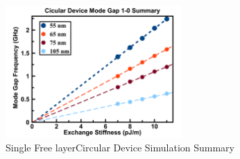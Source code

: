 \begin{figure}[!ht]
  \centering
  \includegraphics[width=0.6\textwidth]{fig/2018/sim/free_only_circular}
   \caption{Single Free layerCircular Device Simulation Summary}
  \label{fig:freecircularsummary}
\end{figure}



